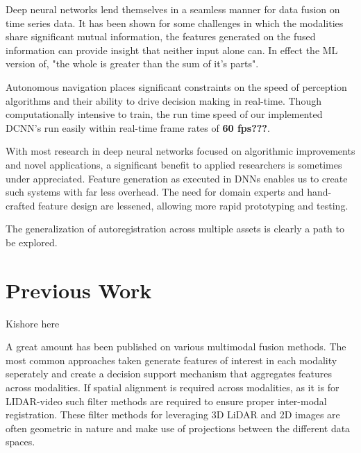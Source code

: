 \documentclass{article}
\begin{document}
Deep neural networks lend themselves in a seamless manner for data fusion on time series data. It has been shown \cite{Ngiam2011Multimodal} for some challenges in which the modalities share significant mutual information, the features generated on the fused information can provide insight that neither input alone can. In effect the ML version of, "the whole is greater than the sum of it's parts". 

Autonomous navigation places significant constraints on the speed of perception algorithms and their ability to drive decision making in real-time. Though computationally intensive to train, the run time speed of our implemented DCNN's run easily within real-time frame rates of \textbf{60 fps???}. 

With most research in deep neural networks focused on algorithmic improvements and novel applications, a significant benefit to applied researchers is sometimes under appreciated. Feature generation
as executed in DNNs enables us to create such systems with far less overhead. The need for domain experts and hand-crafted feature design are lessened, allowing more rapid prototyping and testing. 

The generalization of autoregistration across multiple assets is clearly a path to be explored. 


\section{Previous Work} %
\label{sec:previous_work}
Kishore here

A great amount has been published on various multimodal fusion methods. The most common approaches taken generate features of interest in each modality seperately and create a decision support mechanism that aggregates features across modalities. If spatial alignment is required across modalities, as it is for LIDAR-video such filter methods \cite{Thrun2011Googles-dr} are required to ensure proper inter-modal registration. These filter methods for leveraging 3D LiDAR and 2D images are often geometric in nature and make use of projections between the different data spaces. 



\end{document}
